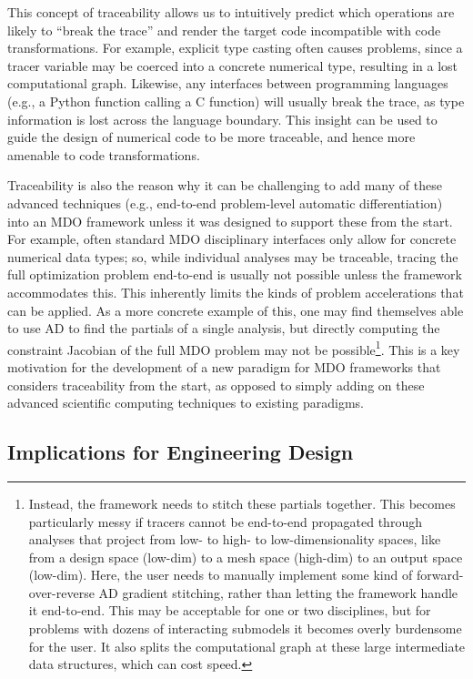This concept of traceability allows us to intuitively predict which operations are likely to ``break the trace'' and render the target code incompatible with code transformations. For example, explicit type casting often causes problems, since a tracer variable may be coerced into a concrete numerical type, resulting in a lost computational graph. Likewise, any interfaces between programming languages (e.g., a Python function calling a C function) will usually break the trace, as type information is lost across the language boundary. This insight can be used to guide the design of numerical code to be more traceable, and hence more amenable to code transformations.

Traceability is also the reason why it can be challenging to add many of these advanced techniques (e.g., end-to-end problem-level automatic differentiation) into an MDO framework unless it was designed to support these from the start. For example, often standard MDO disciplinary interfaces only allow for concrete numerical data types; so, while individual analyses may be traceable, tracing the full optimization problem end-to-end is usually not possible unless the framework accommodates this. This inherently limits the kinds of problem accelerations that can be applied. As a more concrete example of this, one may find themselves able to use AD to find the partials of a single analysis, but directly computing the constraint Jacobian of the full MDO problem may not be possible\footnote{Instead, the framework needs to stitch these partials together. This becomes particularly messy if tracers cannot be end-to-end propagated through analyses that project from low- to high- to low-dimensionality spaces, like from a design space (low-dim) to a mesh space (high-dim) to an output space (low-dim). Here, the user needs to manually implement some kind of forward-over-reverse AD gradient stitching, rather than letting the framework handle it end-to-end. This may be acceptable for one or two disciplines, but for problems with dozens of interacting submodels it becomes overly burdensome for the user. It also splits the computational graph at these large intermediate data structures, which can cost speed.}. This is a key motivation for the development of a new paradigm for MDO frameworks that considers traceability from the start, as opposed to simply adding on these advanced scientific computing techniques to existing paradigms.

\subsection{Implications for Engineering Design}

